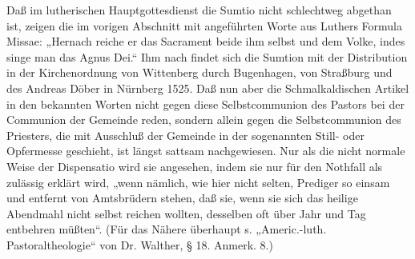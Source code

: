 Daß im lutherischen Hauptgottesdienst die Sumtio nicht schlechtweg abgethan ist, zeigen die im vorigen Abschnitt mit angeführten Worte aus Luthers Formula Missae: „Hernach reiche er das Sacrament beide ihm selbst und dem Volke, indes singe man das Agnus Dei.“ Ihm nach findet sich die Sumtion mit der Distribution in der Kirchenordnung von Wittenberg durch Bugenhagen, von Straßburg und des Andreas Döber in Nürnberg 1525. Daß nun aber die Schmalkaldischen Artikel in den bekannten Worten nicht gegen diese Selbstcommunion des Pastors bei der Communion der Gemeinde reden, sondern allein gegen die Selbstcommunion des Priesters, die mit Ausschluß der Gemeinde in der sogenannten Still- oder Opfermesse geschieht, ist längst sattsam nachgewiesen. Nur als die nicht normale Weise der Dispensatio wird sie angesehen, indem sie nur für den Nothfall als zulässig erklärt wird, „wenn nämlich, wie hier nicht selten, Prediger so einsam und entfernt von Amtsbrüdern stehen, daß sie, wenn sie sich das heilige Abendmahl nicht selbst reichen wollten, desselben oft über Jahr und Tag entbehren müßten“. (Für das Nähere überhaupt s. „Americ.-luth. Pastoraltheologie“ von Dr. Walther, § 18. Anmerk. 8.)

